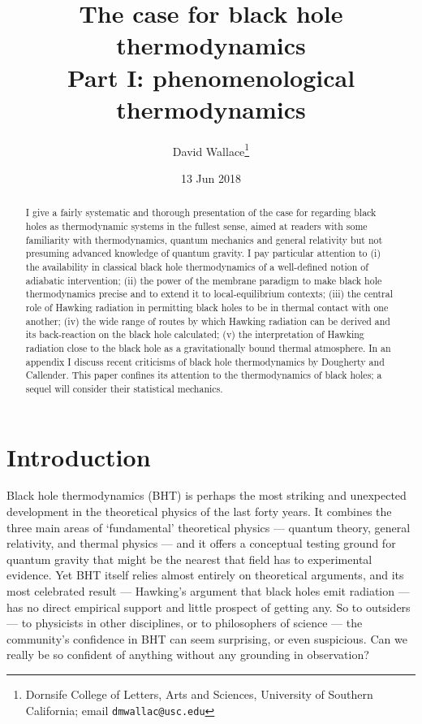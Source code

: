 \documentclass[12pt]{article}
\date{13 Jun 2018}
\begin{document}
\title{The case for black hole thermodynamics \\  Part I: phenomenological thermodynamics}
\author{David Wallace\thanks{Dornsife College of Letters, Arts and Sciences, University of Southern California; email \texttt{dmwallac@usc.edu}}}
\maketitle

\begin{abstract}
I give a fairly systematic and thorough presentation of the case for regarding black holes as thermodynamic systems in the fullest sense, aimed at readers with some familiarity with thermodynamics, quantum mechanics and general relativity but not presuming advanced knowledge of quantum gravity. I pay particular attention to (i) the availability in classical black hole thermodynamics of a well-defined notion of adiabatic intervention; (ii) the power of the membrane paradigm to make black hole thermodynamics precise and to extend it to local-equilibrium contexts; (iii) the central role of Hawking radiation in permitting black holes to be in thermal contact with one another; (iv) the wide range of routes by which  Hawking radiation can be derived and its back-reaction on the black hole calculated; (v) the interpretation of Hawking radiation close to the black hole as a gravitationally bound thermal atmosphere. In an appendix I discuss recent criticisms of black hole thermodynamics by Dougherty and Callender. This paper confines its attention to the thermodynamics of black holes; a sequel will consider their statistical mechanics. 
\end{abstract}

\newpage

\section{Introduction}

Black hole thermodynamics (BHT) is perhaps the most striking and unexpected development in the theoretical physics of the last forty years. It combines the three main areas of `fundamental' theoretical physics --- quantum theory, general relativity, and thermal physics --- and it offers a conceptual testing ground for quantum gravity that might be the nearest that field has to experimental evidence. Yet BHT itself relies almost entirely on theoretical arguments, and its most celebrated result --- Hawking's argument that black holes emit radiation --- has no direct empirical support and little prospect of getting any. So to outsiders --- to physicists in other disciplines, or to philosophers of science --- the community's confidence in BHT can seem surprising, or even suspicious. Can we really be so confident of anything without any grounding in observation?
\end{document}
